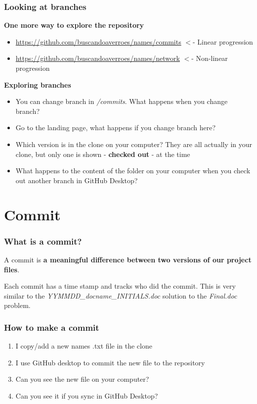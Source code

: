 \documentclass[aspectratio=169]{beamer} %
\newcommand{\trainingURL}[1]{{\color{blue}\url{#1}}}
\newcommand{\traininerUsername}{buscandoaverroes}
\newcommand{\repoName}{\traininerUsername/names}
\newcommand{\trainingRepoURL}[1]{\trainingURL{https://github.com/\repoName #1}}
\begin{document}
\begin{frame}
\frametitle{Looking at branches}


	\textbf{One more way to explore the repository}
	\begin{itemize}
		\item \trainingRepoURL{/commits} $<$- Linear progression
		\item \trainingRepoURL{/network} $<$- Non-linear progression
	\end{itemize}

	\vspace{.1cm}

	\textbf{Exploring branches}
	\begin{itemize}
		\item You can change branch in \textit{/commits}. What happens when you change branch?
		\item Go to the landing page, what happens if you change branch here?
		\item Which version is in the clone on your computer? They are all actually in your clone, but only one is shown - \textbf{checked out} - at the time
		\item What happens to the content of the folder on your computer when you check out another branch in GitHub Desktop?
	\end{itemize}

\end{frame}




\section{Commit}

\begin{frame}
\frametitle{What is a commit?}

	A commit is \textbf{a meaningful difference between two versions of our project files}.

	\vspace{.25cm}

	Each commit has a time stamp and tracks who did the commit. This is very similar to the \textit{YYMMDD\_docname\_INITIALS.doc} solution to the \textit{Final.doc} problem.

\end{frame}

\begin{frame}
\frametitle{How to make a commit}


	\begin{enumerate}
		\item I copy/add a new names .txt file in the clone
		\item I use GitHub desktop to commit the new file to the repository
		\item Can you see the new file on your computer?
		\item Can you see it if you sync in GitHub Desktop?
	\end{enumerate}

\end{frame}
\end{document}
